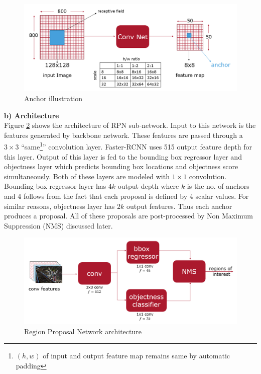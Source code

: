 \begin{figure}
    \centering
    \includegraphics[width=\linewidth]{images/anchors.PNG}
    \caption[Anchor illustration]{Anchor illustration}
    \label{fig:anchors}
\end{figure}

\textbf{b) Architecture} \\
Figure \ref{fig:RPN-architecture} shows the architecture of RPN sub-network. Input to this network is the features generated by backbone network. These features are passed through a $3\times3$ ``same\footnote{$(h,w)$ of input and output feature map remains same by automatic padding}'' convolution layer. Faster-RCNN uses 515 output feature depth for this layer. Output of this layer is fed to the bounding box regressor layer and objectness layer which predicts bounding box locations and objectness score simultaneously. Both of these layers are modeled with $1\times1$ convolution. Bounding box regressor layer has $4k$ output depth where $k$ is the no. of anchors and 4 follows from the fact that each proposal is defined by 4 scalar values. For similar reasons, objectness layer has $2k$ output features. Thus each anchor produces a proposal. All of these proposals are post-processed by Non Maximum Suppression (NMS) discussed later. 

\begin{figure}
    \centering
    \includegraphics[width=\linewidth]{images/RPN-architecture.PNG}
    \caption[RPN architecture]{Region Proposal Network architecture}
    \label{fig:RPN-architecture}
\end{figure}

